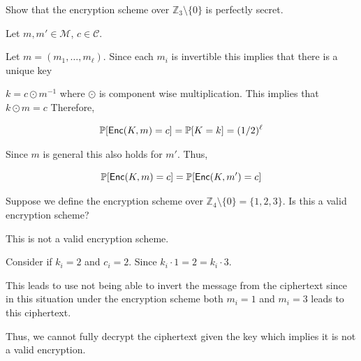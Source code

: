 \documentclass[12pt, letterpaper]{article}
\renewcommand{\P}{\mathbb{P}}
\begin{document}
\begin{subproblem}{}
    Show that the encryption scheme over $\mathbb{Z}_{3} \setminus \{0\}$ is perfectly secret.
\end{subproblem}
\begin{problemproof}
    Let $m,m' \in \mathcal{M}$, $c \in \mathcal{C}$.

    Let $m=(m_1,\dots,m_\ell)$. Since each $m_i$ is invertible this implies that there is a unique key

    $k = c \odot m^{-1}$ where $\odot$ is component wise multiplication. This implies that $k \odot m = c$ Therefore,

    \begin{align*}
        \P[\skcenc(K,m)=c]=\P[K=k]=(1/2)^\ell
    \end{align*}

    Since $m$ is general this also holds for  $m'$. Thus,

    \[\P[\skcenc(K,m)=c]=\P[\skcenc(K,m')=c]\]
\end{problemproof}

\begin{subproblem}{}
    Suppose we define the encryption scheme over $\mathbb{Z}_4 \setminus \{0\}=\{1,2,3\}$. 
    Is this a valid encryption scheme?
\end{subproblem}
\begin{problemproof}
    This is not a valid encryption scheme.

    Consider if $k_i=2$ and $c_i=2$. Since $k_i \cdot 1 = 2 = k_i \cdot 3$.

    This leads to use not being able to invert the message from the ciphertext since in this situation under the encryption scheme both $m_i=1$ and $m_i=3$ leads to this ciphertext.

    Thus, we cannot fully decrypt the ciphertext given the key which implies it is not a valid encryption.
\end{problemproof}
\end{document}
